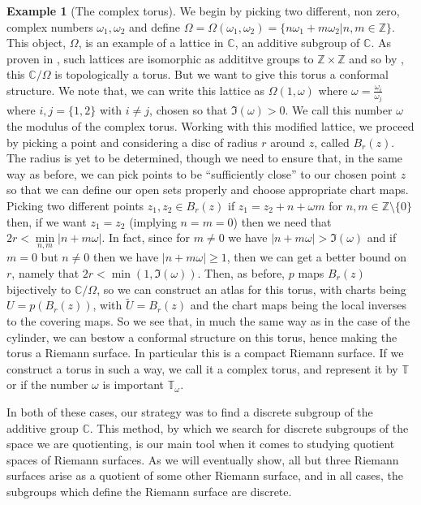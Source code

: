 \documentclass[11pt]{report}
\theoremstyle{definition}
\newtheorem*{example*}{Example}
\begin{document}
\begin{example*}[The complex torus]
We begin by picking two different, non zero, complex numbers $\omega_1, \omega_2$ and define $\Omega = \Omega(\omega_1,\omega_2) = \{n\omega_1 + m\omega_2 \vert n,m \in \mathbb{Z} \}$. This object, $\Omega$, is an example of a lattice in $\mathbb{C}$, an additive subgroup of $\mathbb{C}$. As proven in \cite[p.58]{comfun}, such lattices are isomorphic as addititve groups to $\mathbb{Z} \times \mathbb{Z}$ and so by \cite[Example 1.43]{Hatchers}, this $\mathbb{C}/\Omega$ is topologically a torus. But we want to give this torus a conformal structure. We note that, we can write this lattice as $\Omega(1,\omega)$ where $\omega=\frac{\omega_i}{\omega_j}$ where $i,j = \{1, 2\}$ with $i \neq j$, chosen so that $\Im(\omega) > 0$. We call this number $\omega$ the modulus of the complex torus. Working with this modified lattice, we proceed by picking a point and considering a disc of radius $r$ around $z$, called $B_r(z)$. The radius is yet to be determined, though we need to ensure that, in the same way as before, we can pick points to be ``sufficiently close'' to our chosen point $z$ so that we can define our open sets properly and choose appropriate chart maps. Picking two different points $z_1,z_2 \in B_r(z)$ if $z_1 = z_2 + n + \omega m$ for $n,m \in \mathbb{Z}\setminus \{0\}$ then, if we want $z_1=z_2$ (implying $n=m=0$) then we need that $2r < \min\limits_{n,m}|n + m\omega|$. In fact, since for $m \neq 0$ we have $|n+m\omega| > \Im(\omega)$ and if $m=0$ but $n\neq 0$ then we have $|n + m\omega| \geq 1$, then we can get a better bound on $r$, namely that $2r < \min(1, \Im(\omega))$. Then, as before, $p$ maps $B_r(z)$ bijectively to $\mathbb{C}/\Omega$, so we can construct an atlas for this torus, with charts being $U = p(B_r(z))$, with $\tilde{U} = B_r(z)$ and the chart maps being the local inverses to the covering maps. So we see that, in much the same way as in the case of the cylinder, we can bestow a conformal structure on this torus, hence making the torus a Riemann surface. In particular this is a compact Riemann surface. If we construct a torus in such a way, we call it a complex torus, and represent it by $\mathbb{T}$ or if the number $\omega$ is important $\mathbb{T}_{\omega}$.
\end{example*}

In both of these cases, our strategy was to find a discrete subgroup of the additive group $\mathbb{C}$. This method, by which we search for discrete subgroups of the space we are quotienting, is our main tool when it comes to studying quotient spaces of Riemann surfaces. As we will eventually show, all but three Riemann surfaces arise as a quotient of some other Riemann surface, and in all cases, the subgroups which define the Riemann surface are discrete. 
\end{document}
